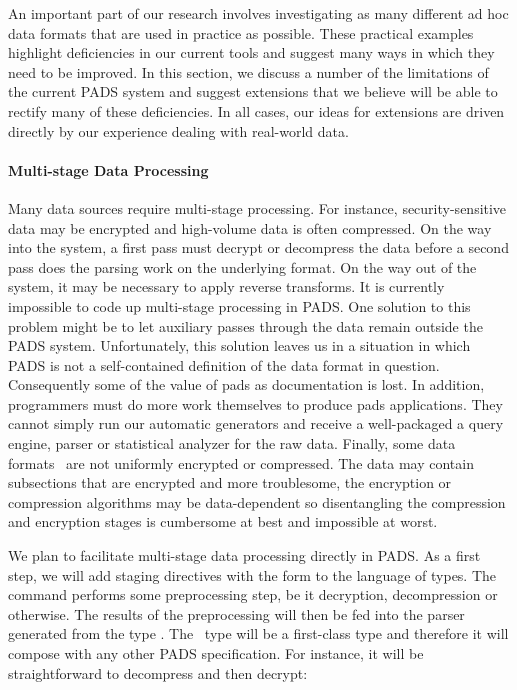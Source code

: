 \documentclass[11pt]{article}
\begin{document}
An important part of our research involves investigating as many
different ad hoc data formats that are used in practice as possible.
These practical examples highlight deficiencies in our current tools
and suggest many ways in which they need to be improved.  In this
section, we discuss a number of the limitations of the current PADS
system and suggest extensions that we believe will be able to rectify
many of these deficiencies.  In all cases, our ideas for extensions
are driven directly by our experience dealing with real-world data.


\paragraph*{Multi-stage Data Processing}
Many data sources require multi-stage processing.  For instance,
security-sensitive data may be encrypted and high-volume data
is often compressed.  On the way into the system, a first 
pass must decrypt or decompress the data before a second pass
does the parsing work on the underlying format.  On the way out of the system, 
it may be necessary to apply reverse transforms.  
It is currently impossible to code up multi-stage processing in PADS.
One solution
to this problem might be to let auxiliary passes through the data
remain outside the PADS system.  Unfortunately, this solution
leaves us in a situation in which PADS is not a self-contained
definition of the data format in question.  Consequently some of the value
of pads as documentation is lost.  In addition, programmers must do
more work themselves to produce pads applications.  They cannot
simply run our automatic generators and receive a well-packaged 
a query engine, parser or statistical analyzer for the raw data.
Finally, some data formats~\cite{korn+:delta,korn+:data-format} are not 
uniformly encrypted or compressed.
The data may contain subsections that are encrypted and more troublesome,
the encryption or compression algorithms may be data-dependent so
disentangling the compression and encryption stages is cumbersome
at best and impossible at worst.

We plan to facilitate multi-stage data processing directly in PADS.  As a
first step, we will add staging directives with the form 
 to the language of types.
The command  performs some preprocessing step, be it
decryption, decompression or otherwise.  The results of the preprocessing
will then be fed into the parser generated from the type .
The \Pthen\ type will be a first-class type and therefore it will compose
with any other PADS specification.  For instance, it will be straightforward to
decompress and then decrypt:  
\end{document}
